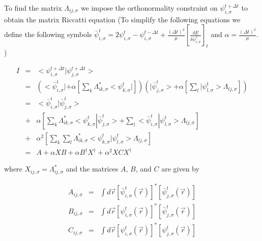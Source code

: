 \noindent
To find the matrix $\Lambda_{ij,\sigma}$ we impose the orthonormality
constraint on $\psi_{i,\sigma}^{t+\Delta t}$ to obtain the
matrix Riccatti equation 
(To simplify the following equations we define the following symbols
$\bar{\psi}_{i,\sigma}^{t} = 2 \psi_{i,\sigma}^{t} -\psi_{i,\sigma}^{t-\Delta t}
              + \frac{(\Delta t)^2}{\mu}
                 \left[ \frac{\delta E}{\delta \psi_{i,\sigma}^{*}} \right]_{t}$
and $\alpha = \frac{(\Delta t)^2}{\mu}$.
)

\begin{eqnarray}
I &=& <\psi_{i,\sigma}^{t+\Delta t} | \psi_{j,\sigma}^{t+\Delta t}> \nonumber \\
  &=& 
   \left( <\bar{\psi}_{i,\sigma}^{t}| 
          + \alpha  
            \left[
                   \sum_{k} \Lambda_{ik,\sigma}^{*} <\psi_{k,\sigma}^{t}|
            \right]
   \right)
   \left( |\bar{\psi}_{j,\sigma}^{t}> 
          + \alpha  
            \left[
                   \sum_{l} |\psi_{l,\sigma}^{t}> \Lambda_{lj,\sigma} 
            \right]
   \right) \nonumber \\
  &=& <\bar{\psi}_{i,\sigma}^{t}| \bar{\psi}_{j,\sigma}^{t}> \nonumber \\
  &+& \alpha 
       \left[
          \sum_{k} \Lambda_{ik,\sigma}^{*} 
                     <\psi_{k,\sigma}^{t}| \bar{\psi}_{j,\sigma}^{t}> 
         + \sum_{l} <\bar{\psi}_{i,\sigma}^{t}| \psi_{l,\sigma}^{t}>
                    \Lambda_{lj,\sigma} 
       \right] \nonumber \\
  &+& \alpha^2 
       \left[
                \sum_{k} \sum_{l}
                 \Lambda_{ik,\sigma}^{*} 
                 <\psi_{k,\sigma}^{t}|\psi_{l,\sigma}^{t}>
                 \Lambda_{lj,\sigma} 
       \right] \nonumber \\
  &=& A + \alpha XB + \alpha B^{\dag}X^{\dag} + \alpha^2 XCX^{\dag} 
\label{eq:b9}
\end{eqnarray}

\noindent
where $X_{ij,\sigma}=\Lambda_{ij,\sigma}^{*}$ and the matrices 
$A$, $B$, and $C$ are given by

\begin{eqnarray}
A_{ij,\sigma} &=& \int d\vec{r} 
             \left[\bar{\psi}_{i,\sigma}^{t}(\vec{r}) 
             \right]^{*} 
             \left[\bar{\psi}_{j,\sigma}^{t}(\vec{r}) 
             \right] \\
B_{ij,\sigma} &=& \int d\vec{r} 
             \left[\psi_{i,\sigma}^{t}(\vec{r}) 
             \right]^{*} 
             \left[\bar{\psi}_{j,\sigma}^{t}(\vec{r}) 
             \right] \\
C_{ij,\sigma} &=& \int d\vec{r} 
             \left[\psi_{i,\sigma}^{t}(\vec{r}) 
             \right]^{*} 
             \left[\psi_{j,\sigma}^{t}(\vec{r}) 
             \right]
\end{eqnarray}

